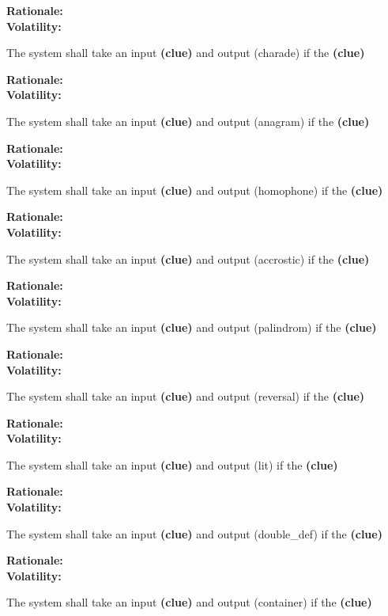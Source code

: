 \textbf{Rationale:}  \\
\textbf{Volatility:} 

\noindent\llap{\textbf{[R11/1]}}The system shall take an input \textbf{(clue)} and output (charade) if the \textbf{(clue)}

\textbf{Rationale:}  \\
\textbf{Volatility:} 

\noindent\llap{\textbf{[R12/1]}}The system shall take an input \textbf{(clue)} and output (anagram) if the \textbf{(clue)}

\textbf{Rationale:}  \\
\textbf{Volatility:} 

\noindent\llap{\textbf{[R13/1]}}The system shall take an input \textbf{(clue)} and output (homophone) if the \textbf{(clue)}

\textbf{Rationale:}  \\
\textbf{Volatility:} 

\noindent\llap{\textbf{[R14/1]}}The system shall take an input \textbf{(clue)} and output (accrostic) if the \textbf{(clue)}

\textbf{Rationale:}  \\
\textbf{Volatility:} 

\noindent\llap{\textbf{[R15/1]}}The system shall take an input \textbf{(clue)} and output (palindrom) if the \textbf{(clue)}

\textbf{Rationale:}  \\
\textbf{Volatility:} 

\noindent\llap{\textbf{[R16/1]}}The system shall take an input \textbf{(clue)} and output (reversal) if the \textbf{(clue)}

\textbf{Rationale:}  \\
\textbf{Volatility:} 

\noindent\llap{\textbf{[R17/1]}}The system shall take an input \textbf{(clue)} and output (lit) if the \textbf{(clue)}

\textbf{Rationale:}  \\
\textbf{Volatility:} 

\noindent\llap{\textbf{[R18/1]}}The system shall take an input \textbf{(clue)} and output (double\_def) if the \textbf{(clue)}

\textbf{Rationale:}  \\
\textbf{Volatility:} 

\noindent\llap{\textbf{[R19/1]}}The system shall take an input \textbf{(clue)} and output (container) if the \textbf{(clue)}

